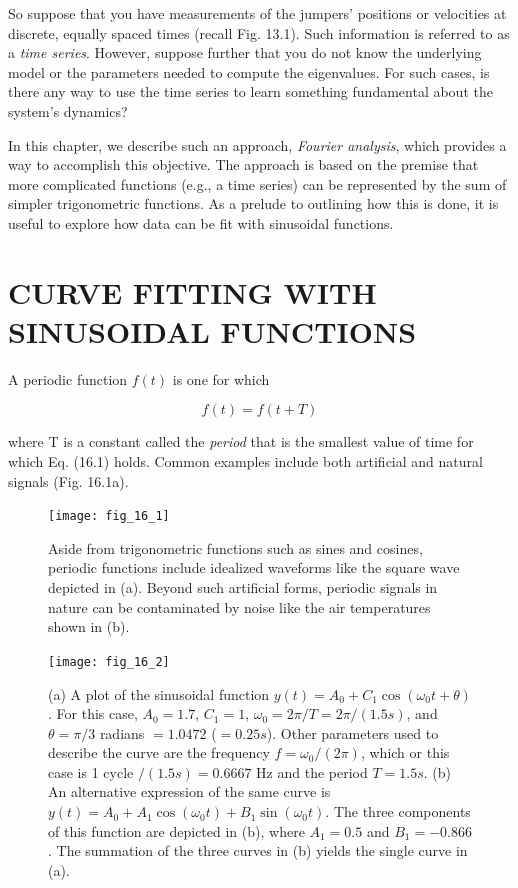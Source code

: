 \documentclass[../main.tex]{subfiles}
\begin{document}
So suppose that you have measurements of the jumpers' positions or velocities at discrete, equally spaced times (recall Fig. 13.1). Such information is referred to as a \textit{time series}. However, suppose further that you do not know the underlying model or the parameters needed to compute the eigenvalues. For such cases, is there any way to use the time
series to learn something fundamental about the system's dynamics?

In this chapter, we describe such an approach, \textit{Fourier analysis}, which provides a way to accomplish this objective. The approach is based on the premise that more complicated functions (e.g., a time series) can be represented by the sum of simpler trigonometric functions. As a prelude to outlining how this is done, it is useful to explore how data can be fit
with sinusoidal functions.

\label{cha:cha_P_16_1}
\section{CURVE FITTING WITH SINUSOIDAL FUNCTIONS}

\noindent A periodic function $f(t)$ is one for which

\begin{equation}
	\tag{16.1}
	f(t) = f(t + T)
\end{equation}

\noindent where T is a constant called the \textit{period} that is the smallest value of time for which Eq. (16.1) holds. Common examples include both artificial and natural signals (Fig. 16.1a).

\begin{figure}[H]
	\centering
	\texttt{[image: fig\_16\_1]}
	\caption{\textsf{Aside from trigonometric functions such as sines and cosines, periodic functions include
	idealized waveforms like the square wave depicted in (a). Beyond such artificial forms, periodic
	signals in nature can be contaminated by noise like the air temperatures shown in (b).}}
	\label{fig:fig_16_1}
\end{figure}

\begin{figure}[H]
	\centering
	\texttt{[image: fig\_16\_2]}
	\caption{\textsf{(a) A plot of the sinusoidal function $y(t) = A_0 + C_1 \cos(\omega_0 t + \theta)$. For this case, $A_0 = 1.7$, $C_1 = 1$, $\omega_0 = 2 \pi / T = 2 \pi / (1.5 s)$, and $\theta = \pi / 3$ radians $= 1.0472$ ($= 0.25 s$). Other	parameters used to describe the curve are the frequency $f = \omega_0 /(2\pi)$, which or this case is 1 cycle $/ (1.5 s) = 0.6667$ Hz and the period $T = 1.5 s$. (b) An alternative expression of the same curve is $y(t) = A_0 + A_1 \cos(\omega_0 t) + B_1 \sin(\omega_0 t)$. The three components of this function are depicted in (b), where $A_1 = 0.5$ and $B_1 = -0.866$. The summation of the three curves in (b) yields the single curve in (a).}}
	\label{fig:fig_16_2}
\end{figure}
\end{document}
